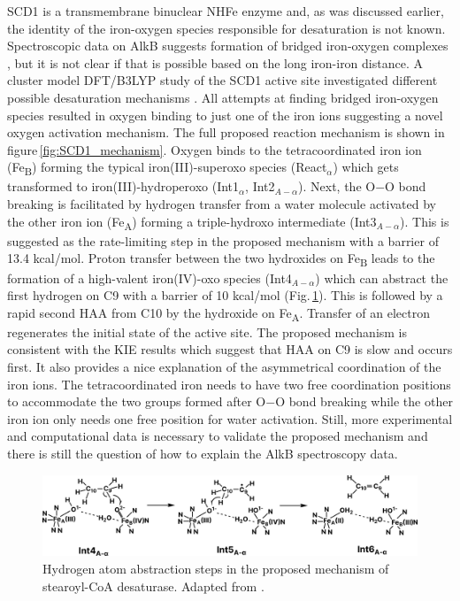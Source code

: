 SCD1 is a transmembrane binuclear NHFe enzyme and, as was discussed earlier, the identity of the iron-oxygen species responsible for desaturation is not known. Spectroscopic data on AlkB suggests formation of bridged iron-oxygen complexes \cite{Shanklin1997}, but it is not clear if that is possible based on the long iron-iron distance. A cluster model DFT/B3LYP study of the SCD1 active site investigated different possible desaturation mechanisms \cite{Yu2019}. All attempts at finding bridged iron-oxygen species resulted in oxygen binding to just one of the iron ions suggesting a novel oxygen activation mechanism. The full proposed reaction mechanism is shown in figure\,\ref{fig:SCD1_mechanism}. Oxygen binds to the tetracoordinated iron ion (Fe\textsubscript{B}) forming the typical iron(III)-superoxo species (React$_{\alpha}$) which gets transformed to iron(III)-hydroperoxo (Int1$_{\alpha}$, Int2$_{A-\alpha}$). Next, the O$-$O bond breaking is facilitated by hydrogen transfer from a water molecule activated by the other iron ion (Fe\textsubscript{A}) forming a triple-hydroxo intermediate (Int3$_{A-\alpha}$). This is suggested as the rate-limiting step in the proposed mechanism with a barrier of 13.4 kcal/mol. Proton transfer between the two hydroxides on Fe\textsubscript{B} leads to the formation of a high-valent iron(IV)-oxo species (Int4$_{A-\alpha}$) which can abstract the first hydrogen on C9 with a barrier of 10 kcal/mol (Fig.\,\ref{fig:Desaturation}). This is followed by a rapid second HAA from C10 by the hydroxide on Fe\textsubscript{A}. Transfer of an electron regenerates the initial state of the active site. The proposed mechanism is consistent with the KIE results which suggest that HAA on C9 is slow and occurs first. It also provides a nice explanation of the asymmetrical coordination of the iron ions. The tetracoordinated iron needs to have two free coordination positions to accommodate the two groups formed after O$-$O bond breaking while the other iron ion only needs one free position for water activation. Still, more experimental and computational data is necessary to validate the proposed mechanism and there is still the question of how to explain the AlkB spectroscopy data.  

\begin{figure}[htbp]
    \centering
    \includegraphics[width=\textwidth]{Figures/Desaturation_steps.pdf}
    \caption{Hydrogen atom abstraction steps in the proposed mechanism of stearoyl-CoA desaturase. Adapted from \cite{Yu2019}.}
    \label{fig:Desaturation}
\end{figure}

